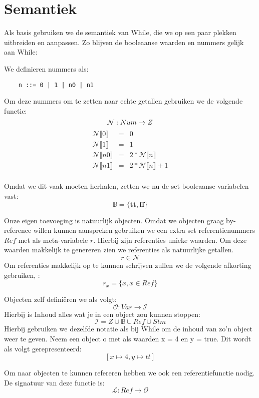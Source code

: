 \documentclass[12pt]{article}
\begin{document}
\section{Semantiek}

Als basis gebruiken we de semantiek van While, die we op een paar plekken uitbreiden en aanpassen.
Zo blijven de booleaanse waarden en nummers gelijk aan While:

We definieren nummers als:
\begin{lstlisting}
	n ::= 0 | 1 | n0 | n1
\end{lstlisting}

Om deze nummers om te zetten naar echte getallen gebruiken we de volgende functie:
$$
\mathcal{N}: Num \rightarrow Z \\
$$
$$
\begin{matrix}
\mathcal{N}\llbracket 0 \rrbracket &= &0  \\
\mathcal{N}\llbracket 1 \rrbracket &= &1 \\
\mathcal{N}\llbracket n0 \rrbracket &= &2 * \mathcal{N}\llbracket n \rrbracket \\
\mathcal{N}\llbracket n1 \rrbracket &= &2 * \mathcal{N}\llbracket n \rrbracket + 1 \\
\end{matrix}
$$

Omdat we dit vaak moeten herhalen, zetten we nu de set booleaanse variabelen vast:
$$ \mathds{B} = \{\boldsymbol{tt},\boldsymbol{ff}\} $$

Onze eigen toevoeging is natuurlijk objecten. Omdat we objecten graag by-reference willen kunnen aanspreken gebruiken we een extra set referentienummers $Ref$ met als meta-variabele $r$. Hierbij zijn referenties unieke waarden. Om deze waarden makkelijk te genereren zien we referenties als natuurlijke getallen. 
$$ r \in \mathcal{N}$$
Om referenties makkelijk op te kunnen schrijven zullen we de volgende afkorting gebruiken, :
$$r_x = \{x, x \in Ref\}$$

Objecten zelf definiëren we als volgt:
$$\mathcal{O} : Var \rightarrow \mathcal{I}$$ 
Hierbij is Inhoud alles wat je in een object zou kunnen stoppen: 
$$\mathcal{I} = Z \cup \mathds{B} \cup Ref \cup Stm$$ 
Hierbij gebruiken we dezelfde notatie als bij While om de inhoud van zo'n object weer te geven.
Neem een object o met als waarden x = 4 en y = true. Dit wordt als volgt gerepresenteerd:
$$[x \mapsto 4, y \mapsto tt]$$

Om naar objecten te kunnen refereren hebben we ook een referentiefunctie nodig. De signatuur van deze functie is:
$$\mathcal{L} : Ref \rightarrow \mathcal{O}$$
	
\end{document}
